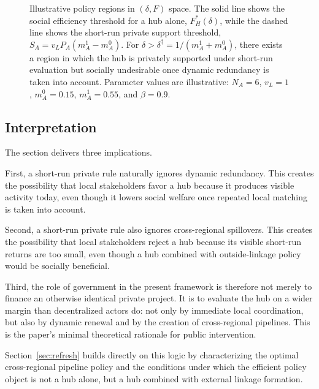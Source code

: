 \begin{figure}[htbp]
\caption{Illustrative policy regions in $(\delta,F)$ space. The solid line shows the social efficiency threshold for a hub alone, $F_H^*(\delta)$, while the dashed line shows the short-run private support threshold, $S_A=v_LP_A(m_A^1-m_A^0)$. For $\delta>\delta^{\dagger}=1/(m_A^1+m_A^0)$, there exists a region in which the hub is privately supported under short-run evaluation but socially undesirable once dynamic redundancy is taken into account. Parameter values are illustrative: $N_A=6$, $v_L=1$, $m_A^0=0.15$, $m_A^1=0.55$, and $\beta=0.9$.}
\label{fig:delta_F_regions}
\end{figure}

\subsection{Interpretation}

The section delivers three implications.

First, a short-run private rule naturally ignores dynamic redundancy. This creates the possibility that local stakeholders favor a hub because it produces visible activity today, even though it lowers social welfare once repeated local matching is taken into account.

Second, a short-run private rule also ignores cross-regional spillovers. This creates the possibility that local stakeholders reject a hub because its visible short-run returns are too small, even though a hub combined with outside-linkage policy would be socially beneficial.

Third, the role of government in the present framework is therefore not merely to finance an otherwise identical private project. It is to evaluate the hub on a wider margin than decentralized actors do: not only by immediate local coordination, but also by dynamic renewal and by the creation of cross-regional pipelines. This is the paper's minimal theoretical rationale for public intervention.

Section~\ref{sec:refresh} builds directly on this logic by characterizing the optimal cross-regional pipeline policy and the conditions under which the efficient policy object is not a hub alone, but a hub combined with external linkage formation.
